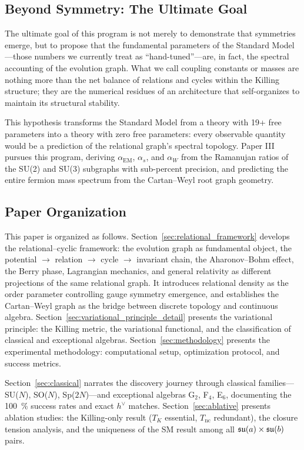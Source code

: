 \subsection{Beyond Symmetry: The Ultimate Goal}\label{sec:ultimate_goal}

The ultimate goal of this program is not merely to demonstrate that symmetries emerge, but to propose that the fundamental parameters of the Standard Model---those numbers we currently treat as ``hand-tuned''---are, in fact, the spectral accounting of the evolution graph. What we call coupling constants or masses are nothing more than the net balance of relations and cycles within the Killing structure; they are the numerical residues of an architecture that self-organizes to maintain its structural stability.

This hypothesis transforms the Standard Model from a theory with 19+ free parameters into a theory with zero free parameters: every observable quantity would be a prediction of the relational graph's spectral topology. Paper III pursues this program, deriving $\alpha_{\mathrm{EM}}$, $\alpha_s$, and $\alpha_W$ from the Ramanujan ratios of the SU(2) and SU(3) subgraphs with sub-percent precision, and predicting the entire fermion mass spectrum from the Cartan--Weyl root graph geometry.

\subsection{Paper Organization}\label{sec:organization}

This paper is organized as follows. Section~\ref{sec:relational_framework} develops the relational--cyclic framework: the evolution graph as fundamental object, the potential $\to$ relation $\to$ cycle $\to$ invariant chain, the Aharonov--Bohm effect, the Berry phase, Lagrangian mechanics, and general relativity as different projections of the same relational graph. It introduces relational density as the order parameter controlling gauge symmetry emergence, and establishes the Cartan--Weyl graph as the bridge between discrete topology and continuous algebra. Section~\ref{sec:variational_principle_detail} presents the variational principle: the Killing metric, the variational functional, and the classification of classical and exceptional algebras. Section~\ref{sec:methodology} presents the experimental methodology: computational setup, optimization protocol, and success metrics.

Section~\ref{sec:classical} narrates the discovery journey through classical families---SU($N$), SO($N$), Sp($2N$)---and exceptional algebras G$_2$, F$_4$, E$_6$, documenting the \SI{100}{\percent} success rates and exact $h^\vee$ matches. Section~\ref{sec:ablative} presents ablation studies: the Killing-only result ($T_K$ essential, $T_{\mathrm{nc}}$ redundant), the closure tension analysis, and the uniqueness of the SM result among all $\mathfrak{su}(a) \times \mathfrak{su}(b)$ pairs.

